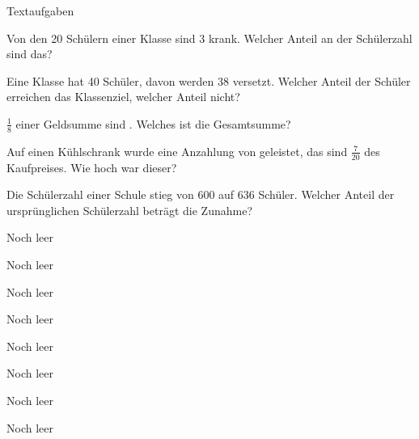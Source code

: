 \documentclass[12pt,a5paper,landscape]{scrartcl}
\begin{document}
	\begin{karte2}{Textaufgaben}
		\begin{enumeratea}
			\item Von den 20 Schülern einer Klasse sind 3 krank. Welcher Anteil an der Schülerzahl sind das?
			
			\item Eine Klasse hat 40 Schüler, davon werden 38 versetzt. Welcher Anteil der Schüler erreichen das Klassenziel, welcher Anteil nicht?
			
			\item $\tfrac{1}{8}$ einer Geldsumme sind . Welches ist die Gesamtsumme?
			
			\item Auf einen Kühlschrank wurde eine Anzahlung von  geleistet, das sind $\tfrac{7}{20}$ des Kaufpreises. Wie hoch war dieser?
			
			\item Die Schülerzahl einer Schule stieg von 600 auf 636 Schüler. Welcher Anteil der ursprünglichen Schülerzahl beträgt die Zunahme?
		\end{enumeratea}
	\end{karte2}
	
	\leereKarte
	
	\begin{karte1}{Noch leer}
	\end{karte1}
	
	\begin{karte1}{Noch leer}
	\end{karte1}
	
	\begin{karte1}{Noch leer}
	\end{karte1}
	
	\begin{karte1}{Noch leer}
	\end{karte1}
	
	\begin{karte1}{Noch leer}
	\end{karte1}
	
	\begin{karte1}{Noch leer}
	\end{karte1}
	
	\begin{karte1}{Noch leer}
	\end{karte1}
	
	\begin{karte1}{Noch leer}
	\end{karte1}
		
\end{document}

